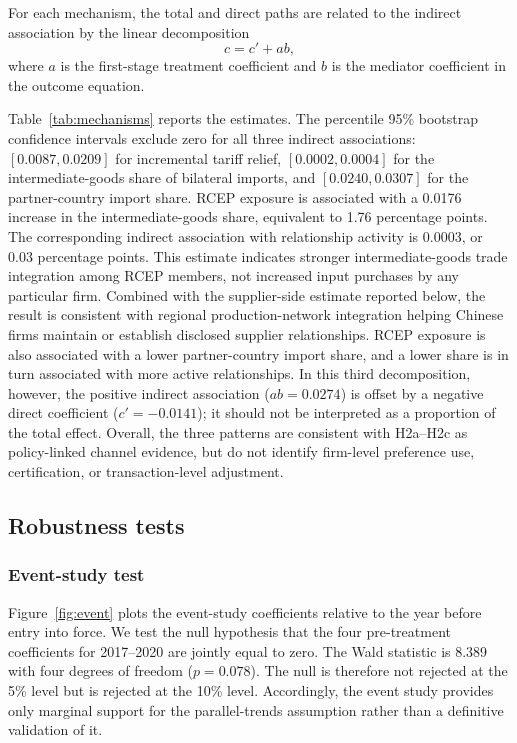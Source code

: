 \documentclass[preprint,12pt,authoryear]{elsarticle}
\begin{document}
For each mechanism, the total and direct paths are related to the indirect
association by the linear decomposition
\begin{equation}
\label{eq:mechanism_decomposition}
c=c'+ab,
\end{equation}
where $a$ is the first-stage treatment coefficient and $b$ is the mediator
coefficient in the outcome equation.

Table~\ref{tab:mechanisms} reports the estimates. The percentile 95\% bootstrap confidence intervals exclude zero for all three indirect associations: $[0.0087,0.0209]$ for incremental tariff relief, $[0.0002,0.0004]$ for the intermediate-goods share of bilateral imports, and $[0.0240,0.0307]$ for the partner-country import share. RCEP exposure is associated with a 0.0176 increase in the intermediate-goods share, equivalent to 1.76 percentage points. The corresponding indirect association with relationship activity is 0.0003, or 0.03 percentage points. This estimate indicates stronger intermediate-goods trade integration among RCEP members, not increased input purchases by any particular firm. Combined with the supplier-side estimate reported below, the result is consistent with regional production-network integration helping Chinese firms maintain or establish disclosed supplier relationships. RCEP exposure is also associated with a lower partner-country import share, and a lower share is in turn associated with more active relationships. In this third decomposition, however, the positive indirect association ($ab=0.0274$) is offset by a negative direct coefficient ($c'=-0.0141$); it should not be interpreted as a proportion of the total effect. Overall, the three patterns are consistent with H2a--H2c as policy-linked channel evidence, but do not identify firm-level preference use, certification, or transaction-level adjustment.



\subsection{Robustness tests}

\subsubsection{Event-study test}

Figure~\ref{fig:event} plots the event-study coefficients relative to the year before entry into force. We test the null hypothesis that the four pre-treatment coefficients for 2017--2020 are jointly equal to zero. The Wald statistic is 8.389 with four degrees of freedom ($p=0.078$). The null is therefore not rejected at the 5\% level but is rejected at the 10\% level. Accordingly, the event study provides only marginal support for the parallel-trends assumption rather than a definitive validation of it.
\end{document}
